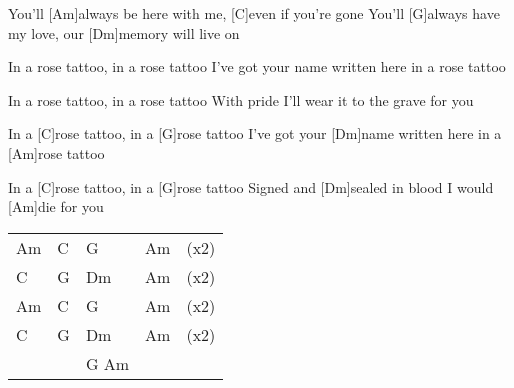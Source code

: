 \begin{guitar}
	You’ll [Am]always be here with me, [C]even if you’re gone
	You’ll [G]always have my love, our [Dm]memory will live on
	
	 
	
	In a rose tattoo, in a rose tattoo
	I’ve got your name written here in a rose tattoo
	
	In a rose tattoo, in a rose tattoo
	With pride I'll wear it to the grave for you
	
	In a [C]rose tattoo, in a [G]rose tattoo
	I’ve got your [Dm]name written here in a [Am]rose tattoo
	
	In a [C]rose tattoo, in a [G]rose tattoo
	Signed and [Dm]sealed in blood I would [Am]die for you
	
	{\footnotesize\begin{tabular}{l|l|l|l l}
			Am	& C	& G		& Am	& (x2) \\
			C	& G	& Dm	& Am	& (x2) \\
			Am	& C	& G		& Am	& (x2) \\
			C	& G	& Dm	& Am	& (x2) \\
			~	& ~	& G Am	& ~		& ~
	\end{tabular}}
	
\end{guitar}